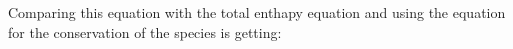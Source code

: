 \documentclass[preprint,12pt,authoryear]{elsarticle}
\begin{document}
Comparing this equation with the total enthapy equation and 
using the equation for the conservation of the species is 
getting:

%
%
%
\end{document}
